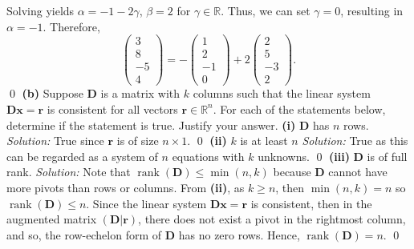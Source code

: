 \documentclass{article}
\begin{document}
Solving yields $\alpha=-1-2\gamma$, $\beta=2$ for $\gamma\in\mathbb{R}$. Thus, we can set $\gamma=0$, resulting in $\alpha=-1$. Therefore, \[\begin{pmatrix}3\\8\\-5\\4\end{pmatrix}=-\begin{pmatrix}1\\2\\-1\\0\end{pmatrix}+2\begin{pmatrix}2\\5\\-3\\2\end{pmatrix}.\] \qed
\newline
\newline\textbf{(b)} Suppose $\mathbf{D}$ is a matrix with $k$ columns such that the linear system $\mathbf{Dx}=\mathbf{r}$ is consistent for all vectors $\mathbf{r}\in\mathbb{R}^n$. For each of the statements below, determine if the statement is true. Justify your answer.
\newline
\newline\textbf{(i)} $\mathbf{D}$ has $n$ rows.
\newline\textit{Solution:} True since $\mathbf{r}$ is of size $n\times 1$. \qed 
\newline
\newline\textbf{(ii)} $k$ is at least $n$
\newline\textit{Solution:} True as this can be regarded as a system of $n$ equations with $k$ unknowns. \qed 
\newline
\newline\textbf{(iii)} $\mathbf{D}$ is of full rank.
\newline\textit{Solution:} Note that $\operatorname{rank}(\mathbf{D})\le \operatorname{min}(n,k)$ because $\mathbf{D}$ cannot have more pivots than rows or columns. From \textbf{(ii)}, as $k \ge n$, then $\operatorname{min}(n,k)=n$ so $\operatorname{rank}(\mathbf{D})\le n$. Since the linear system $\mathbf{Dx}=\mathbf{r}$ is consistent, then in the augmented matrix $\left(\mathbf{D}|\mathbf{r}\right)$, there does not exist a pivot in the rightmost column, and so, the row-echelon form of $\mathbf{D}$ has no zero rows. Hence, $\operatorname{rank}(\mathbf{D})=n$. \qed 
\end{document}

